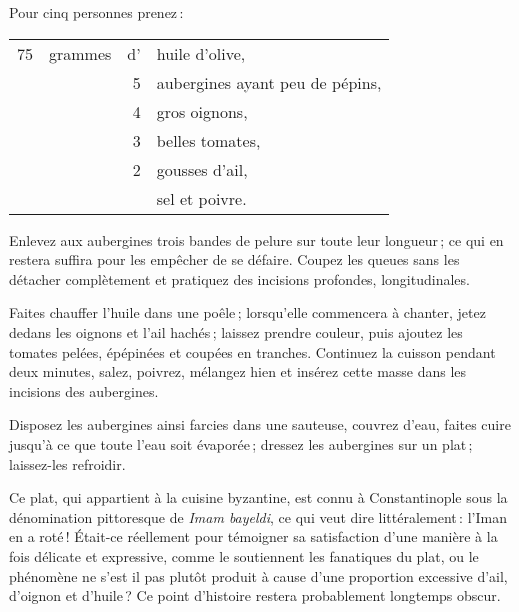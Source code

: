 Pour cinq personnes prenez :

\footnotesize
\begin{longtable}{rrrp{16em}}
     75 & grammes & d' & huile d'olive,                                                                   \\
        &         &  5 & aubergines ayant peu de pépins,                                                  \\
        &         &  4 & gros oignons,                                                                    \\
        &         &  3 & belles tomates,                                                                  \\
        &         &  2 & gousses d'ail,                                                                   \\
        &         &    & sel et poivre.                                                                   \\
\end{longtable}
\normalsize

Enlevez aux aubergines trois bandes de pelure sur toute leur longueur ; ce qui
en restera suffira pour les empêcher de se défaire. Coupez les queues sans les
détacher complètement et pratiquez des incisions profondes, longitudinales.

Faites chauffer l'huile dans une poêle ; lorsqu'elle commencera à chanter,
jetez dedans les oignons et l'ail hachés ; laissez prendre couleur, puis
ajoutez les tomates pelées, épépinées et coupées en tranches. Continuez la
cuisson pendant deux minutes, salez, poivrez, mélangez hien et insérez cette
masse dans les incisions des aubergines.

Disposez les aubergines ainsi farcies dans une sauteuse, couvrez d'eau, faites
cuire jusqu'à ce que toute l'eau soit évaporée ; dressez les aubergines sur un
plat ; laissez-les refroidir.

\medskip

Ce plat, qui appartient à la cuisine byzantine, est connu à Constantinople sous
la dénomination pittoresque de \textit{Imam bayeldi}, ce qui veut dire
littéralement : l'Iman en a roté ! Était-ce réellement pour témoigner sa
satisfaction d'une manière à la fois délicate et expressive, comme le
soutiennent les fanatiques du plat, ou le phénomène ne s'est il pas plutôt
produit à cause d'une proportion excessive d'ail, d'oignon et d'huile ? Ce
point d'histoire restera probablement longtemps obscur.

